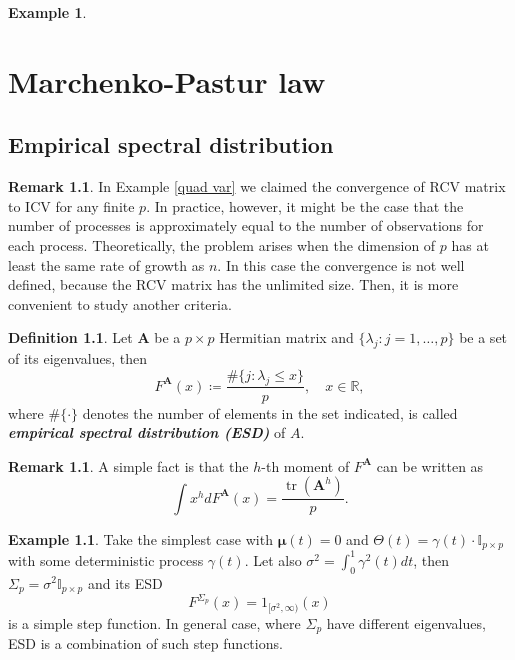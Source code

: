 \documentclass[a4paper,11pt]{book}
\theoremstyle{plain}
\theoremstyle{definition}
\newtheorem{defn}[thm]{Definition}
\newtheorem{exmp}[thm]{Example}
\newtheorem{rmrk}[thm]{Remark}
\newcommand{\MR}{\mathbb{R}}
\newcommand{\tr}{\operatorname{tr}}
\newcommand{\define}[1]{\textit{\textbf{#1}}}
\begin{document}
\begin{exmp}
	\end{exmp}
	
	\chapter{Marchenko-Pastur law}
	\section{Empirical spectral distribution}
	\begin{rmrk}
		In Example \ref{quad var} we claimed the convergence of RCV matrix to ICV for any finite $p$. In practice, however, it might be the case that the number of processes is approximately equal to the number of observations for each process. Theoretically, the problem arises when the dimension of $p$ has at least the same rate of growth as $n$. In this case the convergence is not well defined, because the RCV matrix has the unlimited size. Then, it is more convenient to study another criteria.
	\end{rmrk}
	
	\begin{defn}
		Let $\mathbf{A}$ be a $p \times p$ Hermitian matrix and $\{\lambda_j:j=1,\dots, p\}$ be a set of its eigenvalues, then
		\[F^{\mathbf{A}}(x) \coloneqq \frac{\#\{j:\lambda_j \leq x\}}{p}, \quad x \in \MR, \]
		where $\#\{ \cdot \}$ denotes the number of elements in the set indicated, is called \define{empirical spectral distribution (ESD)} of $A$.
	\end{defn}
	
	\begin{rmrk}
		A simple fact is that the $h$-th moment of $F^{\mathbf{A}}$ can be written as
		\[ \int x^h dF^{\mathbf{A}}(x) = \frac{\tr(\mathbf{A}^h)}{p}. \]
	\end{rmrk}
	
	\begin{exmp} \label{ESD finite p}
		Take the simplest case with $\boldsymbol{\mu}(t) = 0$ and $\Theta(t) = \gamma(t) \cdot \mathbb{I}_{p \times p}$ with some deterministic process $\gamma(t)$. Let also $\sigma^2 = \int_{0}^{1} \gamma^2(t) dt$, then $\Sigma_p = \sigma^2 \mathbb{I}_{p \times p}$ and its ESD
		\[ F^{\Sigma_p}(x) = 1_{[\sigma^2, \infty)}(x) \]
		is a simple step function. In general case, where $\Sigma_p$ have different eigenvalues, ESD is a combination of such step functions.
	\end{exmp}
	
\end{document}
